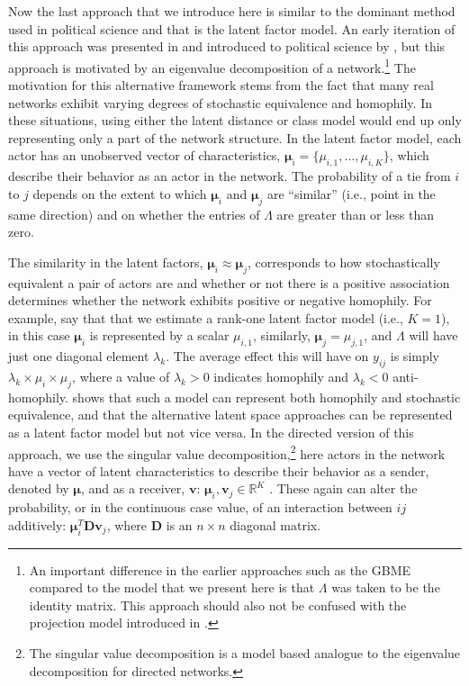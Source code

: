 Now the last approach that we introduce here is similar to the dominant method used in political science and that is the latent factor model. An early iteration of this approach was presented in \citet{hoff:2005} and introduced to political science by \citet{hoff:ward:2004}, but this approach is motivated by an eigenvalue decomposition of a network.\footnote{An important difference in the earlier approaches such as the GBME compared to the model that we present here is that $\Lambda$ was taken to be the identity matrix. This approach should also not be confused with the projection model introduced in \citet{hoff:etal:2002}.} The motivation for this alternative framework stems from the fact that many real networks exhibit varying degrees of stochastic equivalence and homophily. In these situations, using either the latent distance or class model would end up only representing only a part of the network structure. In the latent factor model, each actor has an unobserved vector of characteristics, $\bm\mu_{i} = \{\mu_{i,1}, \ldots, \mu_{i,K} \}$, which describe their behavior as an actor in the network. The probability of a tie from $i$ to $j$ depends on the extent to which $\bm\mu_{i}$ and $\bm\mu_{j}$ are ``similar'' (i.e., point in the same direction) and on whether the entries of $\Lambda$ are greater than or less than zero. 

The similarity in the latent factors, $\bm\mu_{i} \approx \bm\mu_{j}$, corresponds to how stochastically equivalent a pair of actors are and whether or not there is a positive association determines whether the network exhibits positive or negative homophily. For example, say that that we estimate a rank-one latent factor model (i.e., $K=1$), in this case $\bm\mu_{i}$ is represented by a scalar $\mu_{i,1}$, similarly, $\bm\mu_{j}=\mu_{j,1}$, and $\Lambda$ will have just one diagonal element $\lambda_{k}$. The average effect this will have on $y_{ij}$ is simply $\lambda_{k} \times \mu_{i} \times \mu_{j}$, where a value of $\lambda_{k}>0$ indicates homophily and $\lambda_{k}<0$ anti-homophily. \citet{hoff:2008} shows that such a model can represent both homophily and stochastic equivalence, and that the alternative latent space approaches can be represented as a latent factor model but not vice versa. In the directed version of this approach, we use the singular value decomposition,\footnote{The singular value decomposition is a model based analogue to the eigenvalue decomposition for directed networks.} here actors in the network have a vector of latent characteristics to describe their behavior as a sender, denoted by $\bm\mu$, and as a receiver, $\textbf{v}$: $\bm\mu_{i}, \textbf{v}_{j} \in \mathbb{R}^{K}$ \citep{hoff:2009}. These again can alter the probability, or in the continuous case value, of an interaction between $ij$ additively: $\bm\mu_{i}^{T} \textbf{D} \textbf{v}_{j}$, where $\textbf{D}$ is an $n \times n$ diagonal matrix. 

